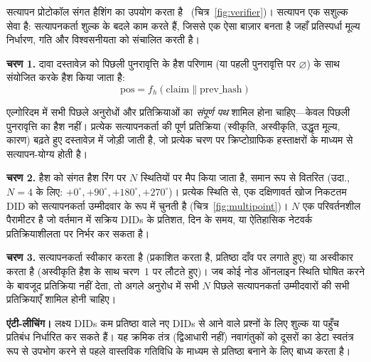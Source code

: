 \documentclass[11pt,a4paper,twocolumn]{article}
\begin{document}
सत्यापन प्रोटोकॉल संगत हैशिंग का उपयोग करता है~\cite{karger1997} (चित्र~\ref{fig:verifier})। सत्यापन एक सशुल्क सेवा है: सत्यापनकर्ता शुल्क के बदले काम करते हैं, जिससे एक ऐसा बाज़ार बनता है जहाँ प्रतिस्पर्धा मूल्य निर्धारण, गति और विश्वसनीयता को संचालित करती है।

\textbf{चरण 1.} दावा दस्तावेज़ को पिछली पुनरावृत्ति के हैश परिणाम (या पहली पुनरावृत्ति पर $\varnothing$) के साथ संयोजित करके हैश किया जाता है:
\begin{equation}
\text{pos} = f_h(\text{claim} \| \text{prev\_hash})
\label{eq:hash}
\end{equation}

एल्गोरिदम में सभी पिछले अनुरोधों और प्रतिक्रियाओं का \emph{संपूर्ण पथ} शामिल होना चाहिए---केवल पिछली पुनरावृत्ति का हैश नहीं। प्रत्येक सत्यापनकर्ता की पूर्ण प्रतिक्रिया (स्वीकृति, अस्वीकृति, उद्धृत मूल्य, कारण) बढ़ते हुए दस्तावेज़ में जोड़ी जाती है, जो प्रत्येक चरण पर क्रिप्टोग्राफिक हस्ताक्षरों के माध्यम से सत्यापन-योग्य होती है।

\textbf{चरण 2.} हैश को संगत हैश रिंग पर $N$ स्थितियों पर मैप किया जाता है, समान रूप से वितरित (उदा., $N=4$ के लिए: $+0^{\circ}, +90^{\circ}, +180^{\circ}, +270^{\circ}$)। प्रत्येक स्थिति से, एक दक्षिणावर्त खोज निकटतम DID को सत्यापनकर्ता उम्मीदवार के रूप में चुनती है (चित्र~\ref{fig:multipoint})। $N$ एक परिवर्तनशील पैरामीटर है जो वर्तमान में सक्रिय DIDs के प्रतिशत, दिन के समय, या ऐतिहासिक नेटवर्क प्रतिक्रियाशीलता पर निर्भर कर सकता है।

\textbf{चरण 3.} सत्यापनकर्ता स्वीकार करता है (प्रकाशित करता है, प्रतिष्ठा दाँव पर लगाते हुए) या अस्वीकार करता है (अस्वीकृति हैश के साथ चरण~1 पर लौटते हुए)। जब कोई नोड ऑनलाइन स्थिति घोषित करने के बावजूद प्रतिक्रिया नहीं देता, तो अगले अनुरोध में सभी $N$ पिछले सत्यापनकर्ता उम्मीदवारों की सभी प्रतिक्रियाएँ शामिल होनी चाहिए।

\textbf{एंटी-लीचिंग।} लक्ष्य DIDs कम प्रतिष्ठा वाले नए DIDs से आने वाले प्रश्नों के लिए शुल्क या पहुँच प्रतिबंध निर्धारित कर सकते हैं। यह क्रमिक तंत्र (द्विआधारी नहीं) नवागंतुकों को दूसरों का डेटा स्वतंत्र रूप से उपभोग करने से पहले वास्तविक गतिविधि के माध्यम से प्रतिष्ठा बनाने के लिए बाध्य करता है।
\end{document}
